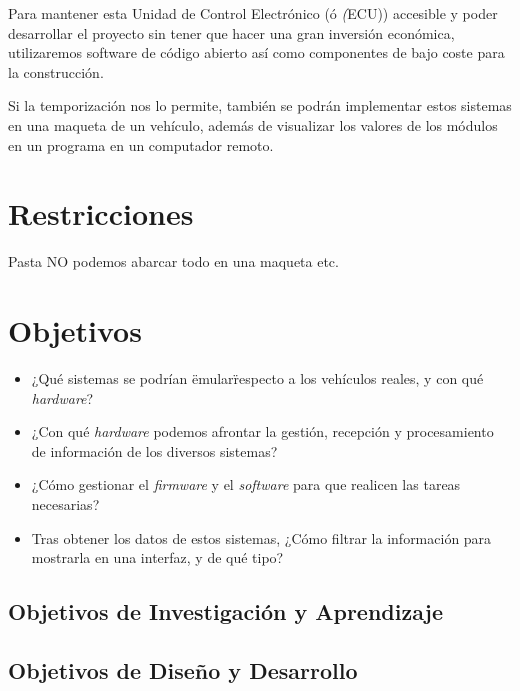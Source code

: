 Para mantener esta Unidad de Control Electrónico (ó \textit(ECU)) accesible y poder desarrollar el proyecto sin tener que hacer una gran inversión económica, utilizaremos software de código abierto así como componentes de bajo coste para la construcción.

Si la temporización nos lo permite, también se podrán implementar estos sistemas en una maqueta de un vehículo, además de visualizar los valores de los módulos en un programa en un computador remoto.  


\section{Restricciones}
Pasta
NO podemos abarcar todo en una maqueta etc.
\section{Objetivos}



\begin{itemize}
    \item ¿Qué sistemas se podrían \"emular\" respecto a los vehículos reales, y con qué \textit{hardware}?
    \item ¿Con qué \textit{hardware} podemos afrontar la gestión, recepción y procesamiento de información de los diversos sistemas?
    \item ¿Cómo gestionar el \textit{firmware} y el \textit{software} para que realicen las tareas necesarias?
    \item Tras obtener los datos de estos sistemas, ¿Cómo filtrar la información para mostrarla en una interfaz, y de qué tipo?
\end{itemize}

\subsection{Objetivos de Investigación y Aprendizaje}
\subsection{Objetivos de Diseño y Desarrollo}
